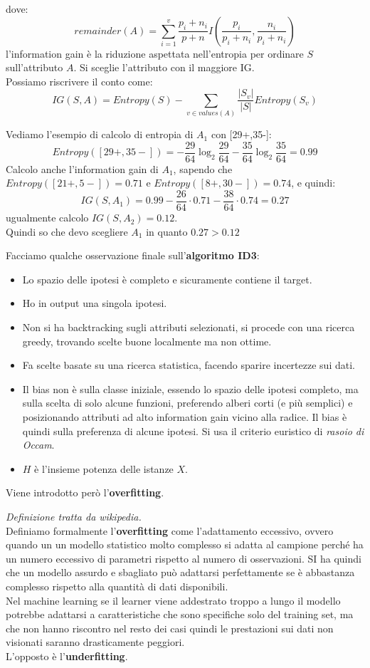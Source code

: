 dove:
\[remainder(A)=\sum_{i=1}^v \frac{p_i+n_i}{p+n}
  I\left(\frac{p_i}{p_i+n_i},\frac{n_i}{p_i+n_i}\right)\]
l'information gain è la riduzione aspettata nell'entropia per ordinare
$S$ sull'attributo $A$. Si sceglie l'attributo con il maggiore IG.\\
Possiamo riscrivere il conto come:
\[IG(S,A)=Entropy(S)-\sum_{v\in values(A)}\frac{|S_v|}{|S|}Entropy(S_v)\]
\begin{esempio}
  Vediamo l'esempio di calcolo di entropia di $A_1$ con [29+,35-]:
  \[Entropy([29+,35-])=
    -\frac{29}{64}\log_2\frac{29}{64}-\frac{35}{64}\log_2\frac{35}{64}=0.99\]
  Calcolo anche l'information gain di $A_1$, sapendo che
  $Entropy([21+,5-])=0.71$ e $Entropy([8+,30-])=0.74$,
  e quindi:
  \[IG(S,A_1)=0.99-\frac{26}{64}\cdot 0.71-\frac{38}{64}\cdot 0.74=0.27\]
  ugualmente calcolo $IG(S,A_2)=0.12$. \\
  Quindi so che devo scegliere $A_1$ in quanto $0.27 > 0.12$
\end{esempio}
Facciamo qualche osservazione finale sull'\textbf{algoritmo ID3}:
\begin{itemize}
  \item Lo spazio delle ipotesi è completo e sicuramente contiene il target.
  \item Ho in output una singola ipotesi.
  \item Non si ha backtracking sugli attributi selezionati, si procede con una
  ricerca greedy, trovando scelte buone localmente ma non ottime.
  \item Fa scelte basate su una ricerca statistica, facendo sparire incertezze
  sui dati.
  \item Il bias non è sulla classe iniziale, essendo lo spazio delle ipotesi
  completo, ma sulla scelta di solo alcune funzioni, preferendo alberi corti (e
  più semplici) e posizionando attributi ad alto information gain vicino alla
  radice. Il bias è quindi sulla preferenza di alcune ipotesi. Si usa il
  criterio euristico di \textit{rasoio di Occam}.
  \item $H$ è l'insieme potenza delle istanze $X$.
\end{itemize}
Viene introdotto però l'\textbf{overfitting}.
\begin{definizione}
  \textit{Definizione tratta da wikipedia.}\\
  Definiamo formalmente l'\textbf{overfitting} come l'adattamento eccessivo,
  ovvero quando 
  un un modello statistico molto complesso si adatta al campione perché ha un
  numero eccessivo di parametri rispetto al numero di osservazioni. SI ha
  quindi che un modello assurdo e sbagliato può adattarsi perfettamente se è
  abbastanza complesso rispetto alla quantità di dati disponibili.\\
  Nel machine learning se il learner viene addestrato troppo a lungo il modello
  potrebbe adattarsi a caratteristiche che sono specifiche solo del training
  set, ma che non hanno riscontro nel resto dei casi quindi le prestazioni sui
  dati non visionati saranno drasticamente peggiori.\\
  L'opposto è l'\textbf{underfitting}.
\end{definizione}

